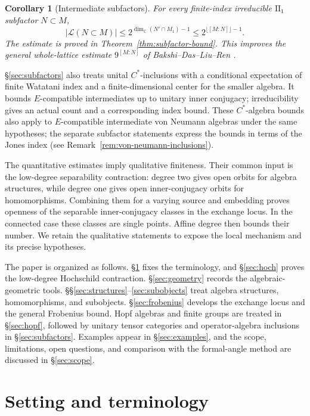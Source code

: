 \documentclass[11pt]{amsart}
\newtheorem{corollary}[theorem]{Corollary}
\theoremstyle{definition}
\theoremstyle{remark}
\newcommand{\CC}{\mathbb C}
\newcommand{\InternalRoadmapAddon}{}
\begin{document}
\begin{corollary}[Intermediate subfactors]\label{cor:intro-subfactor}
For every finite-index irreducible $\mathrm{II}_1$ subfactor $N\subset M$,
\[
 |\mathcal L(N\subset M)|
 \leq 2^{\dim_{\CC}(N'\cap M_1)-1}
 \leq 2^{\lfloor[M:N]\rfloor-1}.
\]
The estimate is proved in Theorem~\ref{thm:subfactor-bound}.
This improves the general whole-lattice estimate $9^{[M:N]}$ of
Bakshi--Das--Liu--Ren \cite{BakshiDasLiuRen}.
\end{corollary}

\S{}\ref{sec:subfactors} also treats unital $C^*$-inclusions with a
conditional expectation of finite Watatani index and a finite-dimensional
center for the smaller algebra.  It bounds $E$-compatible
intermediates up to unitary inner conjugacy; irreducibility gives an
actual count and a corresponding index bound.  These $C^*$-algebra bounds
also apply to $E$-compatible intermediate von Neumann algebras under the
same hypotheses; the separate subfactor statements express the bounds
in terms of the Jones index
(see Remark~\ref{rem:von-neumann-inclusions}).

The quantitative estimates imply qualitative finiteness.  Their common
input is the low-degree separability contraction: degree two gives open
orbits for algebra structures, while degree one gives open
inner-conjugacy orbits for homomorphisms.  Combining them for a varying
source and embedding proves openness of the separable inner-conjugacy
classes in the exchange locus.  In the connected case these classes are
single points.  Affine degree then bounds their number.  We retain the
qualitative statements to expose the local mechanism and its precise
hypotheses.

The paper is organized as follows.  \S{}\ref{sec:setting} fixes the
terminology\InternalRoadmapAddon, and \S{}\ref{sec:hoch} proves the
low-degree Hochschild contraction.  \S{}\ref{sec:geometry} records the
algebraic-geometric tools.  \S\S{}\ref{sec:structures}--\ref{sec:subobjects}
treat algebra structures, homomorphisms, and subobjects.
\S{}\ref{sec:frobenius} develops the exchange locus and the general
Frobenius bound.  Hopf algebras and finite groups are treated in
\S{}\ref{sec:hopf}, followed by unitary tensor categories and
operator-algebra inclusions in \S{}\ref{sec:subfactors}.  Examples appear in
\S{}\ref{sec:examples}, and the scope, limitations, open questions, and
comparison with the formal-angle method are discussed in
\S{}\ref{sec:scope}.
\section{Setting and terminology}\label{sec:setting}
\end{document}
